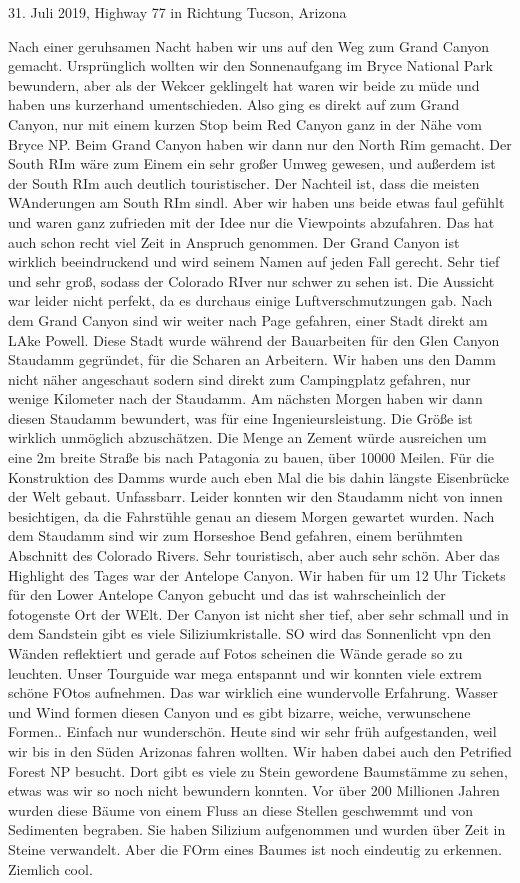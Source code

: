 \documentclass[11pt]{book}
\begin{document}
31. Juli 2019, Highway 77 in Richtung Tucson, Arizona

Nach einer geruhsamen Nacht haben wir uns auf den Weg zum Grand Canyon gemacht. Ursprünglich wollten wir den Sonnenaufgang im Bryce National Park 
bewundern, aber als der Wekcer geklingelt hat waren wir beide zu müde und haben uns kurzerhand umentschieden. Also ging es direkt auf zum Grand Canyon, 
nur mit einem kurzen Stop beim Red Canyon ganz in der Nähe vom Bryce NP. Beim Grand Canyon haben wir dann nur den North Rim gemacht. Der South RIm wäre zum Einem 
ein sehr großer Umweg gewesen, und außerdem ist der South RIm auch deutlich touristischer. Der Nachteil ist, dass die meisten WAnderungen am South RIm 
sindl. Aber wir haben uns beide etwas faul gefühlt und waren ganz zufrieden mit der Idee nur die Viewpoints abzufahren. Das hat auch schon recht viel Zeit 
in Anspruch genommen. Der Grand Canyon ist wirklich beeindruckend und wird seinem Namen auf jeden Fall gerecht. Sehr tief und sehr groß, sodass der Colorado 
RIver nur schwer zu sehen ist. Die Aussicht war leider nicht perfekt, da es durchaus einige Luftverschmutzungen gab. 
Nach dem Grand Canyon sind wir weiter nach Page gefahren, einer Stadt direkt am LAke Powell. Diese Stadt wurde während der Bauarbeiten für den Glen Canyon 
Staudamm gegründet, für die Scharen an Arbeitern. Wir haben uns den Damm nicht näher angeschaut sodern sind direkt zum Campingplatz gefahren, nur wenige Kilometer 
nach der Staudamm. Am nächsten Morgen haben wir dann diesen Staudamm bewundert, was für eine Ingenieursleistung. Die Größe ist wirklich unmöglich abzuschätzen. 
Die Menge an Zement würde ausreichen um eine 2m breite Straße bis nach Patagonia zu bauen, über 10000 Meilen. Für die Konstruktion des Damms wurde auch eben Mal 
die bis dahin längste Eisenbrücke der Welt gebaut. Unfassbarr. Leider konnten wir den Staudamm nicht von innen besichtigen, da die Fahrstühle genau an diesem 
Morgen gewartet wurden. Nach dem Staudamm sind wir zum Horseshoe Bend gefahren, einem berühmten Abschnitt des Colorado Rivers. Sehr touristisch, aber auch 
sehr schön. Aber das Highlight des Tages war der Antelope Canyon. Wir haben für um 12 Uhr Tickets für den Lower Antelope Canyon gebucht und das ist wahrscheinlich 
der fotogenste Ort der WElt. Der Canyon ist nicht sher tief, aber sehr schmall und in dem Sandstein gibt es viele Siliziumkristalle. SO wird das Sonnenlicht vpn den 
Wänden reflektiert und gerade auf Fotos scheinen die Wände gerade so zu leuchten. Unser Tourguide war mega entspannt und wir konnten viele extrem schöne 
FOtos aufnehmen. Das war wirklich eine wundervolle Erfahrung. Wasser und Wind formen diesen Canyon und es gibt bizarre, weiche, verwunschene Formen.. Einfach nur 
wunderschön. 
Heute sind wir sehr früh aufgestanden, weil wir bis in den Süden Arizonas fahren wollten. Wir haben dabei auch den Petrified Forest NP besucht. Dort 
gibt es viele zu Stein gewordene Baumstämme zu sehen, etwas was wir so noch nicht bewundern konnten. Vor über 200 Millionen Jahren wurden diese Bäume 
von einem Fluss an diese Stellen geschwemmt und von Sedimenten begraben. Sie haben Silizium aufgenommen und wurden über Zeit in Steine verwandelt. 
Aber die FOrm eines Baumes ist noch eindeutig zu erkennen. Ziemlich cool. 
\end{document}
